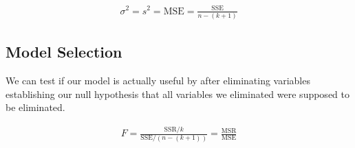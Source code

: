     \begin{equation*}
        \begin{aligned}
            \sigma^2 = s^2 = \text{MSE} = \frac{\text{SSE}}{n - (k + 1)}
        \end{aligned}
    \end{equation*}

    \subsection{Model Selection}
    We can test if our model is actually useful by after eliminating variables establishing our null hypothesis that all
    variables we eliminated were supposed to be eliminated.

    \begin{equation*}
        \begin{aligned}
            F = \frac{\text{SSR}/k}{\text{SSE} / (n - (k + 1))} = \frac{\text{MSR}}{\text{MSE}}
        \end{aligned}
    \end{equation*}
